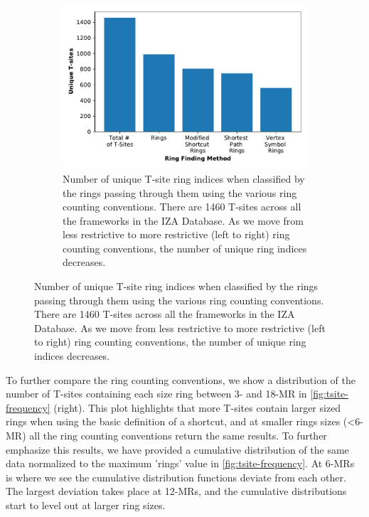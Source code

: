 \documentclass[preprint,numrefs,noinfo,sort&compress]{elsarticle}
\begin{document}
\begin{figure}
\begin{figure}[H]
\centering
\includegraphics[width=\textwidth]{figures/chapter-3/unique-ts.pdf}
\caption{Number of unique T-site ring indices when classified by the rings passing through them using the various ring counting conventions. There are 1460 T-sites across all the frameworks in the IZA Database. As we move from less restrictive to more restrictive (left to right) ring counting conventions, the number of unique ring indices decreases. \label{fig:unique-ts}}
\end{figure}
\end{figure}

To further compare the ring counting conventions, we show a distribution of the number of T-sites containing each size ring between 3- and 18-MR in \cref{fig:tsite-frequency} (right). This plot highlights that more T-sites contain larger sized rings when using the basic definition of a shortcut, and at smaller rings sizes (\textless6-MR) all the ring counting conventions return the same results.  To further emphasize this results, we have provided a cumulative distribution of the same data normalized to the maximum 'rings' value in \cref{fig:tsite-frequency}. At 6-MRs is where we see the cumulative distribution functions deviate from each other. The largest deviation takes place at 12-MRs, and the cumulative distributions start to level out at larger ring sizes. 
\end{document}
